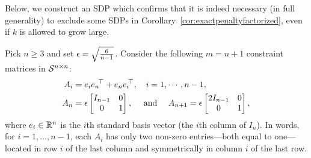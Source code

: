 
Below, we construct an SDP which confirms that it is indeed necessary (in full generality) to exclude some SDPs in Corollary~\ref{cor:exactpenaltyfactorized}, even if $k$ is allowed to grow large.

Pick $n \geq 3$ and set $\epsilon = \sqrt{\frac{6}{n-1}}$. Consider the following $m = n+1$ constraint matrices in $\mathcal{S}^{n\times n}$:
\begin{align*}
A_i & = e_i {e_{n}}^{\!\top} + e_{n} {e_{i}}^{\!\top}, \quad i = 1, \cdots, n-1, \\
A_{n} & = \epsilon \begin{bmatrix}
I_{n-1} & 0 \\ 0 & 1
\end{bmatrix}, \quad \mbox{ and } \quad 
A_{n+1} = \epsilon \begin{bmatrix}
2I_{n-1} & 0 \\ 0 & 1
\end{bmatrix},
\end{align*}
where $e_i \in \mathbb{R}^n$ is the $i$th standard basis vector (the $i$th column of $I_n$).
In words, for $i = 1, \ldots, n-1$, each $A_i$ has only two non-zero entries---both equal to one---located in row $i$ of the last column and symmetrically in column $i$ of the last row.
